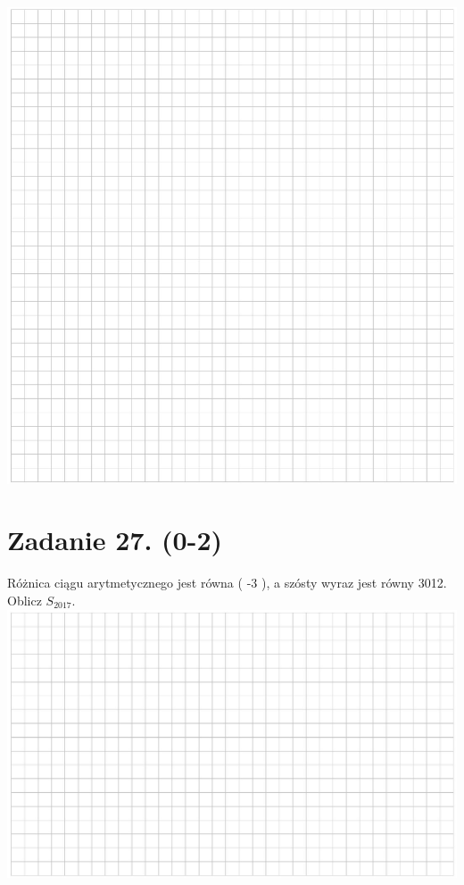 \documentclass[10pt]{article}
\begin{document}
\includegraphics[max width=\textwidth, center]{2024_11_21_94f02db55673a8a7b820g-13(1)}

\section*{Zadanie 27. (0-2)}
Różnica ciągu arytmetycznego jest równa ( -3 ), a szósty wyraz jest równy 3012. Oblicz \(S_{2017}\).\\
\includegraphics[max width=\textwidth, center]{2024_11_21_94f02db55673a8a7b820g-14}
\end{document}
